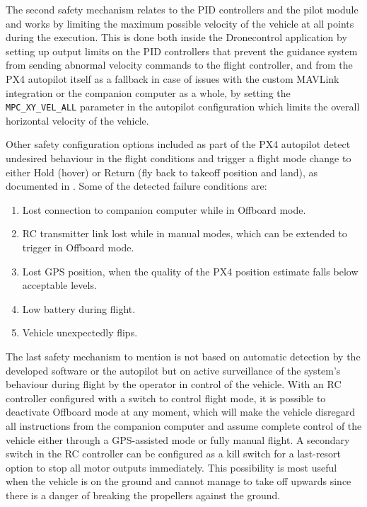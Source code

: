 The second safety mechanism relates to the PID controllers and the pilot module and works by limiting the maximum possible velocity of the vehicle at all points during the execution.
This is done both inside the Dronecontrol application by setting up output limits on the PID controllers that prevent the guidance system from sending abnormal velocity commands to the flight controller, and from the PX4 autopilot itself as a fallback in case of issues with the custom MAVLink integration or the companion computer as a whole, by setting the \texttt{MPC\_XY\_VEL\_ALL} parameter in the autopilot configuration which limits the overall horizontal velocity of the vehicle.

Other safety configuration options included as part of the PX4 autopilot detect undesired behaviour in the flight conditions and trigger a flight mode change to either Hold (hover) or Return (fly back to takeoff position and land), as documented in  \cite{px4-docs-safety}.
Some of the detected failure conditions are:
\begin{enumerate}
    \item Lost connection to companion computer while in Offboard mode.
    \item RC transmitter link lost while in manual modes, which can be extended to trigger in Offboard mode.
    \item Lost GPS position, when the quality of the PX4 position estimate falls below acceptable levels.
    \item Low battery during flight.
    \item Vehicle unexpectedly flips.
\end{enumerate}

The last safety mechanism to mention is not based on automatic detection by the developed software or the autopilot but on active surveillance of the system's behaviour during flight by the operator in control of the vehicle.
With an RC controller configured with a switch to control flight mode, it is possible to deactivate Offboard mode at any moment, which will make the vehicle disregard all instructions from the companion computer and assume complete control of the vehicle either through a GPS-assisted mode or fully manual flight.
A secondary switch in the RC controller can be configured as a kill switch for a last-resort option to stop all motor outputs immediately.
This possibility is most useful when the vehicle is on the ground and cannot manage to take off upwards since there is a danger of breaking the propellers against the ground.
